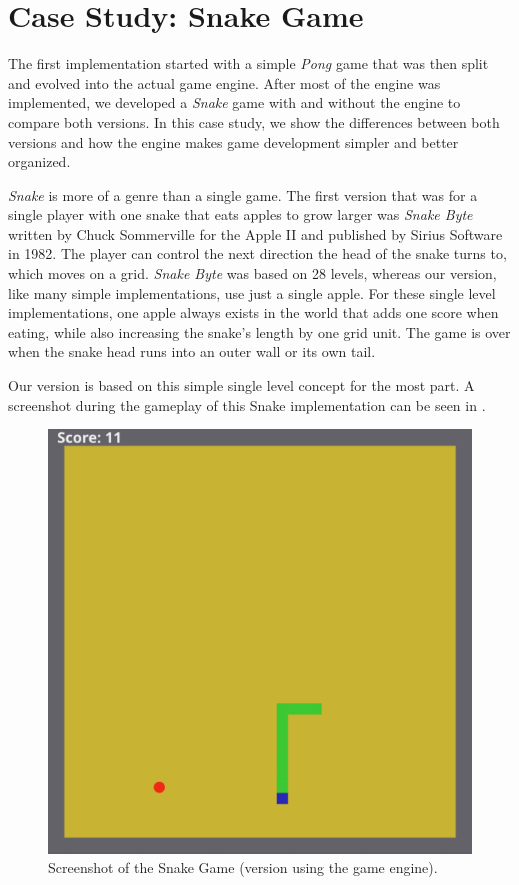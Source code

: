 \chapter{Case Study: Snake Game}\label{chap:casestudy}

The first implementation started with a simple \textit{Pong} game that was then split and evolved into the actual game engine. After most of the engine was implemented, we developed a \textit{Snake} game with and without the engine to compare both versions. In this case study, we show the differences between both versions and how the engine makes game development simpler and better organized.

\textit{Snake} is more of a genre than a single game. The first version that was for a single player with one snake that eats apples to grow larger was \textit{Snake Byte} written by Chuck Sommerville for the Apple II and published by Sirius Software in 1982. The player can control the next direction the head of the snake turns to, which moves on a grid. \textit{Snake Byte} was based on 28 levels, whereas our version, like many simple implementations, use just a single apple. For these single level implementations, one apple always exists in the world that adds one score when eating, while also increasing the snake's length by one grid unit. The game is over when the snake head runs into an outer wall or its own tail.

Our version is based on this simple single level concept for the most part. A screenshot during the gameplay of this Snake implementation can be seen in .

\begin{figure}[h!]
\centering
\includegraphics[width=\linewidth]{img/snake_screenshot.png}
\caption{Screenshot of the Snake Game (version using the game engine).}
\label{fig:snake}
\end{figure}

